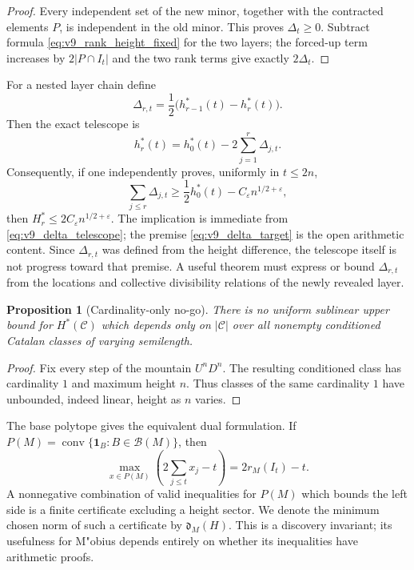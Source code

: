 \documentclass[11pt]{amsart}
\numberwithin{equation}{section}
\theoremstyle{plain}
\newtheorem{proposition}[theorem]{Proposition}
\theoremstyle{definition}
\theoremstyle{remark}
\newcommand{\eps}{\varepsilon}
\begin{document}
\begin{proof}
Every independent set of the new minor, together with the contracted elements
$P$, is independent in the old minor.  This proves $\Delta_t\ge0$.  Subtract
formula \eqref{eq:v9_rank_height_fixed} for the two layers; the forced-up term
increases by $2|P\cap I_t|$ and the two rank terms give exactly
$2\Delta_t$.
\end{proof}

For a nested layer chain define
\begin{equation}
\Delta_{r,t}=\frac12\bigl(h^*_{r-1}(t)-h^*_r(t)\bigr).
\label{eq:v9_delta_rt}
\end{equation}
Then the exact telescope is
\begin{equation}
\boxed{h_r^*(t)=h_0^*(t)-2\sum_{j=1}^r\Delta_{j,t}.}
\label{eq:v9_delta_telescope}
\end{equation}
Consequently, if one independently proves, uniformly in $t\le2n$,
\begin{equation}
\sum_{j\le r}\Delta_{j,t}
\ge \frac12h_0^*(t)-C_\eps n^{1/2+\eps},
\label{eq:v9_delta_target}
\end{equation}
then $H_r^*\le2C_\eps n^{1/2+\eps}$.  The implication is immediate from
\eqref{eq:v9_delta_telescope}; the premise \eqref{eq:v9_delta_target} is the
open arithmetic content.  Since $\Delta_{r,t}$ was defined from the height
difference, the telescope itself is not progress toward that premise.  A
useful theorem must express or bound $\Delta_{r,t}$ from the locations and
collective divisibility relations of the newly revealed layer.

\begin{proposition}[Cardinality-only no-go]
\label{prop:v9_cardinality_no_go}
There is no uniform sublinear upper bound for $H^*(\mathcal C)$ which depends
only on $|\mathcal C|$ over all nonempty conditioned Catalan classes of varying
semilength.
\end{proposition}

\begin{proof}
Fix every step of the mountain $U^nD^n$.  The resulting conditioned class has
cardinality $1$ and maximum height $n$.  Thus classes of the same cardinality
$1$ have unbounded, indeed linear, height as $n$ varies.
\end{proof}

The base polytope gives the equivalent dual formulation.  If
$P(M)=\operatorname{conv}\{\mathbf1_B:B\in\mathcal B(M)\}$, then
\begin{equation}
\max_{x\in P(M)}\left(2\sum_{j\le t}x_j-t\right)=2r_M(I_t)-t.
\label{eq:v9_polytope_rank_dual}
\end{equation}
A nonnegative combination of valid inequalities for $P(M)$ which bounds the
left side is a finite certificate excluding a height sector.  We denote the
minimum chosen norm of such a certificate by $\mathfrak d_M(H)$.  This is a
discovery invariant; its usefulness for M"obius depends entirely on whether
its inequalities have arithmetic proofs.
\end{document}
